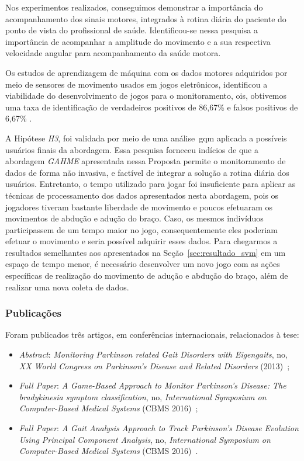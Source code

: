 Nos experimentos realizados, conseguimos demonstrar a importância do acompanhamento dos sinais motores, integrados à rotina diária do paciente do ponto de vista do profissional de saúde. Identificou-se nessa pesquisa a importância de acompanhar a amplitude do movimento e a sua respectiva velocidade angular para acompanhamento da saúde motora.

Os estudos de aprendizagem de máquina com os dados motores adquiridos por meio de sensores de movimento usados em jogos eletrônicos, identificou a viabilidade do desenvolvimento de jogos para o monitoramento, ois, obtivemos uma taxa de identificação de verdadeiros positivos de 86,67\% e falsos positivos de 6,67\% .

A Hipótese \textit{H3}, foi validada por meio de uma análise~\ac{gqm} aplicada a possíveis usuários finais da abordagem. Essa pesquisa forneceu indícios de que a abordagem \textit{GAHME} apresentada nessa Proposta permite o monitoramento de dados de forma não invasiva, e factível de integrar a solução a rotina diária dos usuários. Entretanto, o tempo utilizado para jogar foi insuficiente para aplicar as técnicas de processamento dos dados apresentados nesta abordagem, pois os jogadores tiveram bastante liberdade de movimento e poucos efetuaram os movimentos de abdução e adução do braço. Caso, os mesmos indivíduos participassem de um tempo maior no jogo, consequentemente eles poderiam efetuar o movimento e seria possível adquirir esses dados. Para chegarmos a resultados semelhantes aos apresentados na Seção~\ref{sec:resultado_svm} em um espaço de tempo menor, é necessário desenvolver um novo jogo com as ações específicas de realização do movimento de adução e abdução do braço, além de realizar uma nova coleta 
de dados.

\subsubsection{Publicações}
Foram publicados três artigos, em conferências internacionais, relacionados à tese: 
  \begin{itemize}
   \item \textit{Abstract}: \textit{Monitoring Parkinson related Gait Disorders with Eigengaits}, no, \textit{XX World Congress on Parkinson's Disease and Related Disorders} (2013)~\cite{lmmeigengaits2013};
   \item \textit{Full Paper}: \textit{A Game-Based Approach to Monitor Parkinson’s Disease: The bradykinesia symptom classification}, no, \textit{International Symposium on Computer-Based Medical Systems} (CBMS 2016)~\cite{lmmcbmsgame2016};
   \item \textit{Full Paper}: \textit{A Gait Analysis Approach to Track Parkinson’s Disease Evolution Using Principal Component Analysis}, no, \textit{International Symposium on Computer-Based Medical Systems} (CBMS 2016)~\cite{lmmcbmsgait2016}.
  \end{itemize}


